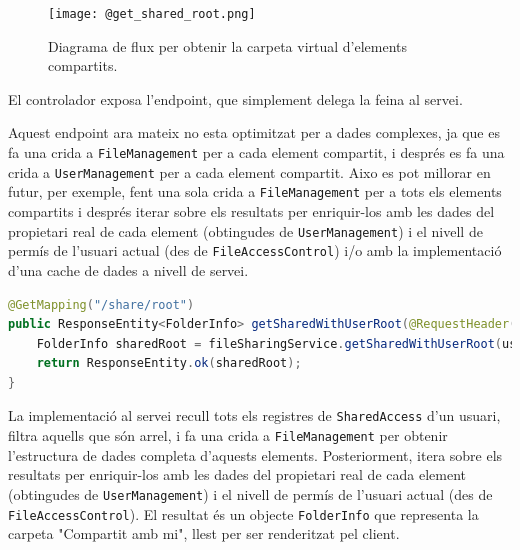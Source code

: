 \begin{figure}[H]
    \centering
    \texttt{[image: @get\_shared\_root.png]}
    \caption{Diagrama de flux per obtenir la carpeta virtual d'elements compartits.}
\end{figure}

El controlador exposa l'endpoint, que simplement delega la feina al servei.

Aquest endpoint ara mateix no esta optimitzat per a dades complexes, ja que es fa una crida a \texttt{FileManagement} per a cada element compartit, i després es fa una crida a \texttt{UserManagement} per a cada element compartit. Aixo es pot millorar en futur, per exemple, fent una sola crida a \texttt{FileManagement} per a tots els elements compartits i després iterar sobre els resultats per enriquir-los amb les dades del propietari real de cada element (obtingudes de \texttt{UserManagement}) i el nivell de permís de l'usuari actual (des de \texttt{FileAccessControl}) i/o amb la implementació d'una cache de dades a nivell de servei.

\begin{lstlisting}[language=Java, caption={Endpoint per obtenir la carpeta arrel compartida a `FileSharingController`}]
@GetMapping("/share/root")
public ResponseEntity<FolderInfo> getSharedWithUserRoot(@RequestHeader("X-User-Id") UUID userId) {
    FolderInfo sharedRoot = fileSharingService.getSharedWithUserRoot(userId);
    return ResponseEntity.ok(sharedRoot);
}
\end{lstlisting}

La implementació al servei recull tots els registres de \texttt{SharedAccess} d'un usuari, filtra aquells que són arrel, i fa una crida a \texttt{FileManagement} per obtenir l'estructura de dades completa d'aquests elements. Posteriorment, itera sobre els resultats per enriquir-los amb les dades del propietari real de cada element (obtingudes de \texttt{UserManagement}) i el nivell de permís de l'usuari actual (des de \texttt{FileAccessControl}). El resultat és un objecte \texttt{FolderInfo} que representa la carpeta "Compartit amb mi", llest per ser renderitzat pel client.

